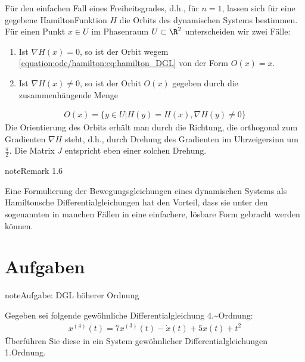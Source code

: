 \documentclass[letterpaper,10pt,german]{jupyterBook}
\begin{document}
\sphinxAtStartPar
Für den einfachen Fall eines Freiheitsgrades, d.h., für \(n = 1\), lassen sich für eine gegebene Hamilton\sphinxhyphen{}Funktion \(H\) die Orbits des dynamischen Systems bestimmen.
Für einen Punkt \(x \in U\) im Phasenraum \(U \subset \R^2\) unterscheiden wir zwei Fälle:
\begin{enumerate}
%
\item {} 
\sphinxAtStartPar
Ist \(\nabla H(x) = 0\), so ist der Orbit wegem \eqref{equation:ode/hamilton:eq:hamilton_DGL} von der Form \(O(x) = {x}\).

\item {} 
\sphinxAtStartPar
Ist \(\nabla H(x) \neq 0\), so ist der Orbit \(O(x)\) gegeben durch die zusammenhängende Menge

\end{enumerate}
\begin{equation*}
\begin{split}O(x) = \{y \in U | H(y) = H(x), \nabla H(y) \neq 0\}\end{split}
\end{equation*}
\sphinxAtStartPar
Die Orientierung des Orbits erhält man durch die Richtung, die orthogonal zum Gradienten \(\nabla H\) steht, d.h., durch Drehung des Gradienten im Uhrzeigersinn um \(\frac{\pi}{2}\).
Die Matrix \(J\) entspricht eben einer solchen Drehung.
\label{ode/hamilton:remark-6}
\begin{sphinxadmonition}{note}{Remark 1.6}



\sphinxAtStartPar
Eine Formulierung der Bewegungsgleichungen eines dynamischen Systems als Hamiltonsche Differentialgleichungen hat den Vorteil, dass sie unter den sogenannten  in manchen Fällen in eine einfachere, lösbare Form gebracht werden können.
\end{sphinxadmonition}


\section{Aufgaben}
\label{\detokenize{ode/ex:aufgaben}}\label{\detokenize{ode/ex::doc}}
\begin{sphinxadmonition}{note}{Aufgabe: DGL höherer Ordnung}

\sphinxAtStartPar
Gegeben sei folgende gewöhnliche Differentialgleichung 4.\textasciitilde{}Ordnung:
\begin{equation*}
\begin{split}x^{(4)}(t) = 7 x^{(3)}(t) - \dot x(t) + 5 x(t) + t^2\end{split}
\end{equation*}
\sphinxAtStartPar
Überführen Sie diese in ein System gewöhnlicher Differentialgleichungen 1.Ordnung.
\end{sphinxadmonition}
\end{document}
